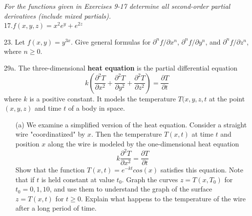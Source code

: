 \documentclass[12pt,letterpaper]{hmcpset}
\begin{document}
\newpage


\begin{problem}
\textit{For the functions given in Exercises 9-17 determine all second-order partial derivatives (include mixed partials).}
\\
17.$f(x,y, z)=x^2e^y+e^{2z}$

\end{problem}

\newpage


\begin{problem}
23. Let $f(x,y)=y^{3x}$. Give general formulas for $\partial^nf/\partial x^n$, $\partial^nf/\partial y^n$, and $\partial^nf/\partial z^n$, where $n\geq0$.
\end{problem}

\newpage


\begin{problem}
29a. The three-dimensional \textbf{heat equation} is the partial differential equation
\begin{equation}
    k(\frac{\partial^2 T}{\partial x^2}+\frac{\partial^2 T}{\partial y^2}+\frac{\partial^2 T}{\partial z^2})=\frac{\partial T}{\partial t}
\end{equation}
where $k$ is a positive constant. It models the temperature $T(x, y, z, t$ at the point $(x,y,z)$ and time $t$ of a body in space.
\end{problem}

\newpage


\begin{problem}

\begin{enumerate}
    \item[(a)] We examine a simplified version of the heat equation. Consider a straight wire "coordinatized" by $x$. Then the temperature $T(x,t)$ at time $t$ and position $x$ along the wire is modeled by the one-dimensional heat equation
    \begin{equation}
        k \frac{\partial^2 T}{\partial x^2}=\frac{\partial T}{\partial t}
    \end{equation}
    Show that the function $T(x,t)=e^{-kt}cos(x)$ satisfies this equation. Note that if $t$ is held constant at value $t_0$. Graph the curves $z=T(x, T_0)$ for $t_0=0, 1, 10$, and use them to understand the graph of the surface $z=T(x,t)$ for $t\geq0$. Explain what happens to the temperature of the wire after a long period of time.
\end{enumerate}
\end{problem}
\end{document}
